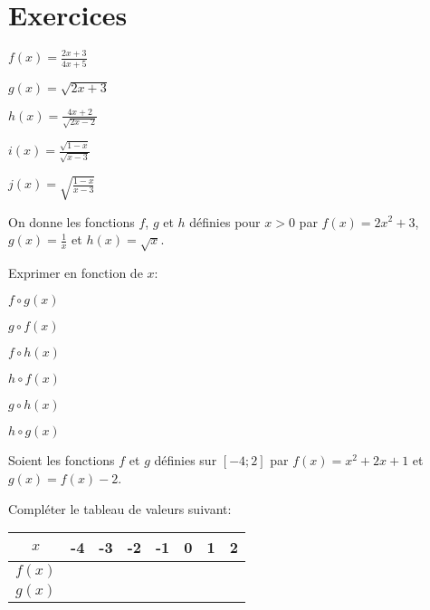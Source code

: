 \documentclass[a4paper,12pt]{scrartcl}
\begin{document}
\section*{Exercices}

\question{}
$f(x) = \frac{2x+3}{4x+5}$

\question{}
$g(x) = \sqrt{2x+3}$

\question{}
$h(x) = \frac{4x+2}{\sqrt{2x-2}}$

\question{}
$i(x) = \frac{\sqrt{1-x}}{\sqrt{x-3}}$

\question{}
$j(x) = \sqrt{\frac{1-x}{x-3}}$

On donne les fonctions $f$, $g$ et $h$ définies pour $x>0$ par $f(x) = 2x^2 + 3$, $g(x) = \frac{1}{x}$ et $h(x) = \sqrt{x}$.

Exprimer en fonction de $x$:

\begin{multicols}{3}
\question{} $f \circ g (x)$

\question{} $g \circ f (x)$

\question{} $f \circ h (x)$

\question{} $h \circ f (x)$

\question{} $g \circ h (x)$

\question{} $h \circ g (x)$
\end{multicols}

Soient les fonctions $f$ et $g$ définies sur $[-4 ;2]$ par $f(x) = x^2 + 2x + 1$ et $g(x) = f(x) - 2$.

\question{}
Compléter le tableau de valeurs suivant:

\begin{center}
\begin{tabular}{|c|c|c|c|c|c|c|c|}
\hline 
$x$ & -4 & -3 & -2 & -1 & 0 & 1 & 2 \\ 
\hline 
$f(x)$ & \hspace{1cm} & \hspace{1cm} & \hspace{1cm} & \hspace{1cm} & \hspace{1cm} & \hspace{1cm} & \hspace{1cm} \\ 
\hline 
$g(x)$ & \hspace{1cm} & \hspace{1cm} & \hspace{1cm} & \hspace{1cm} & \hspace{1cm} & \hspace{1cm} & \hspace{1cm} \\ 
\hline 
\end{tabular} 
\end{center}
\end{document}
